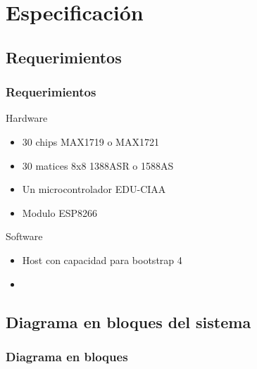 \section{Especificación}

\subsection{Requerimientos}
\begin{frame}
	\frametitle{Requerimientos}
	\begin{block}{Hardware}
		\begin{itemize}
			\item 30 chips MAX1719 o MAX1721
			\item 30 matices 8x8 1388ASR o 1588AS
			\item Un microcontrolador EDU-CIAA
			\item Modulo ESP8266
		\end{itemize}
	\end{block}
	\begin{block}{Software}
		\begin{itemize}
			\item Host con capacidad para bootstrap 4
			\item 
		\end{itemize}
	\end{block}
	

\end{frame}

\subsection{Diagrama en bloques del sistema}
\begin{frame}
	\frametitle{Diagrama en bloques}

\end{frame}

